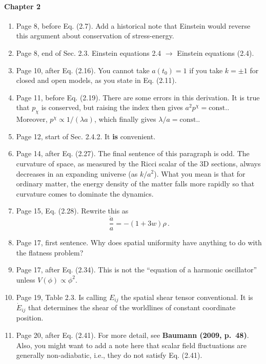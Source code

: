 \documentclass[11pt]{article}
\begin{document}
\paragraph{Chapter 2}
\begin{enumerate}
\item Page 8, before Eq. (2.7). Add a historical note that Einstein
  would reverse this argument about conservation of stress-energy.
\item Page 8, end of Sec. 2.3. Einstein equations 2.4 $\rightarrow$
  Einstein equations (2.4).
\item Page 10, after Eq. (2.16). You cannot take $a(t_0)=1$ if you
  take $k=\pm 1$ for closed and open models, as you state in
  Eq. (2.11).
\item Page 11, before Eq. (2.19). There are some errors in this
  derivation. It is true that $p_\chi$ is conserved, but raising the
  index then gives $a^2 p^\chi = \text{const.}$. Moreover, $p^\chi
  \propto 1/(\lambda a)$, which finally gives $\lambda / a =
  \text{const.}$. 
\item Page 12, start of Sec. 2.4.2. It \textbf{is} convenient.
\item Page 14, after Eq. (2.27). The final sentence of this paragraph
  is odd. The curvature of space, as measured by the Ricci scalar of
  the 3D sections, always decreases in an expanding universe (as
  $k/a^2$). What you mean is that for ordinary matter, the energy
  density of the matter falls more rapidly so that curvature comes to
  dominate the dynamics.
\item Page 15, Eq. (2.28). Rewrite this as 
%
\begin{equation}
\frac{\ddot{a}}{a} = - (1+3w) \rho \, . \tag{2.28}
\end{equation}
%
\item Page 17, first sentence. Why does spatial uniformity have
  anything to do with the flatness problem?
\item Page 17, after Eq. (2.34). This is not the ``equation of a
  harmonic oscillator'' unless $V(\phi) \propto \phi^2$.
\item Page 19, Table 2.3. Is calling $E_{ij}$ the spatial shear tensor
  conventional. It is $\dot{E}_{ij}$ that determines the shear of the
  worldlines of constant coordinate position.
\item Page 20, after Eq. (2.41). For more detail, see \textbf{Baumann
    (2009, p.~48)}. Also, you might want to add a note here that
  scalar field fluctuations are generally non-adiabatic, i.e., they do
  not satisfy Eq. (2.41).

\end{enumerate}
\end{document}
